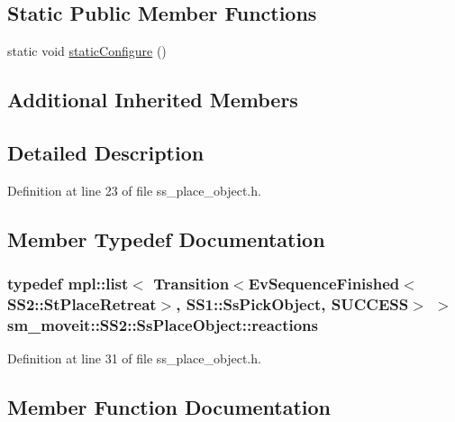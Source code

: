 \subsection*{Static Public Member Functions}
\begin{DoxyCompactItemize}
\item 
static void \hyperlink{structsm__moveit_1_1SS2_1_1SsPlaceObject_a3b82d494fc8511de679c4d1dc8bd71e2}{static\+Configure} ()
\end{DoxyCompactItemize}
\subsection*{Additional Inherited Members}


\subsection{Detailed Description}


Definition at line 23 of file ss\+\_\+place\+\_\+object.\+h.



\subsection{Member Typedef Documentation}
\subsubsection[{\texorpdfstring{reactions}{reactions}}]{\setlength{\rightskip}{0pt plus 5cm}typedef mpl\+::list$<$ Transition$<$Ev\+Sequence\+Finished$<$S\+S2\+::\+St\+Place\+Retreat$>$, {\bf S\+S1\+::\+Ss\+Pick\+Object}, {\bf S\+U\+C\+C\+E\+SS}$>$ $>$ {\bf sm\+\_\+moveit\+::\+S\+S2\+::\+Ss\+Place\+Object\+::reactions}}\hypertarget{structsm__moveit_1_1SS2_1_1SsPlaceObject_acc874c137e9181f6575d964273e5a542}{}\label{structsm__moveit_1_1SS2_1_1SsPlaceObject_acc874c137e9181f6575d964273e5a542}


Definition at line 31 of file ss\+\_\+place\+\_\+object.\+h.



\subsection{Member Function Documentation}
